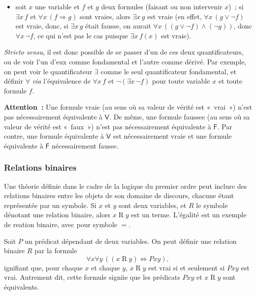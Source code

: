 \begin{itemize}
    \item soit $x$ une variable et $f$ et $g$ deux formules (faisant ou non intervenir $x$) ; si $\exists x \, f$ et $\forall x \, (f \Rightarrow g)$ sont vraies, alors $\exists x \, g$ est vraie (en effet, $\forall x \, (g \vee \neg f)$ est vraie, donc, si $\exists x \, g$ était fausse, on aurait $\forall x \, ((g \vee \neg f) \wedge (\neg g))$, donc $\forall x \, \neg f$, ce qui n'est pas le cas puisque $\exists x \, f(x)$ est vraie). 
\end{itemize}

\textit{Stricto sensu}, il est donc possible de se passer d'un de ces deux quantificateurs, ou de voir l'un d'eux comme fondamental et l'autre comme dérivé. 
Par exemple, on peut voir le quantificateur $\exists$ comme le seul quantificateur fondamental, et définir $\forall$ \textit{via} l'équivalence de $\forall x \, f$ et $\neg \left( \exists x \, \neg f \right)$ pour toute variable $x$ et toute formule $f$. 

\medskip

\noindent\textbf{Attention :} 
    Une formule vraie (au sens où sa valeur de vérité est « vrai ») n'est pas nécessairement équivalente à $\mathsf{V}$.
    De même, une formule faussee (au sens où sa valeur de vérité est « faux ») n'est pas nécessairement équivalente à $\mathsf{F}$.
    Par contre, une formule équivalente à $\mathsf{V}$ est nécessairement vraie et une formule équivalente à $\mathsf{F}$ nécessairement fausse.

\subsubsection{Relations binaires} 
\label{subsub:relations_binaires}

Une théorie définie dans le cadre de la logique du premier ordre peut inclure des relations binaires entre les objets de son domaine de discours, chacune étant représentée par un symbole. 
Si $x$ et $y$ sont deux variables, et $R$ le symbole dénotant une relation binaire, alors $x \mathrel{R} y$ est un terme. 
L'égalité est un exemple de reation binaire, avec pour symbole $=$. 

Soit $P$ un prédicat dépendant de deux variables. 
On peut définir une relation binaire $R$ par la formule 
\begin{equation*}
    \forall x \forall y \, ((x \mathrel{R} y) \Leftrightarrow P x y),
\end{equation*}
ignifiant que, pour chaque $x$ et chaque $y$, $x \mathrel{R} y$ est vrai si et seulement si $P x y$ est vrai. 
Autrement dit, cette formule signiie que les prédicats $P x y$ et $x \mathrel{R} y$ sont équivalents.

